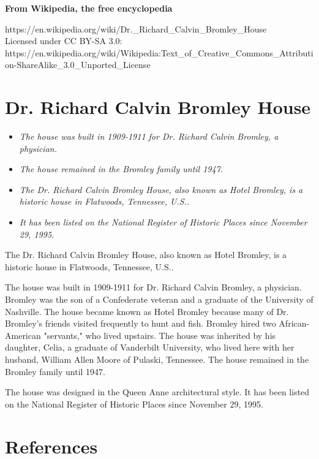 \textbf{From Wikipedia, the free encyclopedia}

https://en.wikipedia.org/wiki/Dr.\_Richard\_Calvin\_Bromley\_House\\
Licensed under CC BY-SA 3.0:\\
https://en.wikipedia.org/wiki/Wikipedia:Text\_of\_Creative\_Commons\_Attribution-ShareAlike\_3.0\_Unported\_License

\section{Dr. Richard Calvin Bromley
House}\label{dr.-richard-calvin-bromley-house}

\begin{itemize}
\item
  \emph{The house was built in 1909-1911 for Dr. Richard Calvin Bromley,
  a physician.}
\item
  \emph{The house remained in the Bromley family until 1947.}
\item
  \emph{The Dr. Richard Calvin Bromley House, also known as Hotel
  Bromley, is a historic house in Flatwoods, Tennessee, U.S..}
\item
  \emph{It has been listed on the National Register of Historic Places
  since November 29, 1995.}
\end{itemize}

The Dr. Richard Calvin Bromley House, also known as Hotel Bromley, is a
historic house in Flatwoods, Tennessee, U.S..

The house was built in 1909-1911 for Dr. Richard Calvin Bromley, a
physician. Bromley was the son of a Confederate veteran and a graduate
of the University of Nashville. The house became known as Hotel Bromley
because many of Dr. Bromley's friends visited frequently to hunt and
fish. Bromley hired two African-American "servants," who lived upstairs.
The house was inherited by his daughter, Celia, a graduate of Vanderbilt
University, who lived here with her husband, William Allen Moore of
Pulaski, Tennessee. The house remained in the Bromley family until 1947.

The house was designed in the Queen Anne architectural style. It has
been listed on the National Register of Historic Places since November
29, 1995.

\section{References}\label{references}
